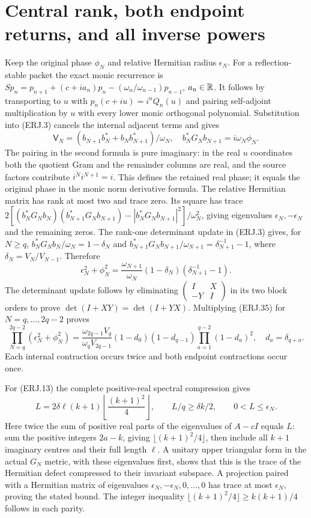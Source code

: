 \documentclass[11pt]{article}
\begin{document}
\section{Central rank, both endpoint returns, and all inverse powers}
Keep the original phase $\phi_N$ and relative Hermitian radius
$\epsilon_N$. For a reflection-stable packet the exact monic recurrence
is $Sp_n=p_{n+1}+(c+ia_n)p_n-(\omega_n/\omega_{n-1})p_{n-1}$,
$a_n\in\mathbb R$. It follows by transporting to $u$ with
$p_n(c+iu)=i^nQ_n(u)$ and pairing self-adjoint multiplication by $u$
with every lower monic orthogonal polynomial. Substitution into
(ERJ.3) cancels the internal adjacent terms and gives
\[
 \mathsf V_N=(b_{N+1}b_N^*+b_Nb_{N+1}^*)/\omega_N,
 \quad b_N^*G_Nb_{N+1}=i\omega_N\phi_N.
 \tag{ERJ.34}
\]
The pairing in the second formula is pure imaginary: in the real
$u$ coordinates both the quotient Gram and the remainder columns
are real, and the source factors contribute
$\overline{i^N}i^{N+1}=i$. This defines the retained real phase;
it equals the original phase in the monic norm derivative formula.
The relative Hermitian matrix has rank at most two and trace zero.
Its square has trace
$2[(b_N^*G_Nb_N)(b_{N+1}^*G_Nb_{N+1})-
|b_N^*G_Nb_{N+1}|^2]/\omega_N^2$, giving eigenvalues
$\epsilon_N,-\epsilon_N$ and the remaining zeros.
The rank-one determinant update in (ERJ.3) gives, for $N\ge q$,
$b_N^*G_Nb_N/\omega_N=1-\delta_N$ and
$b_{N+1}^*G_Nb_{N+1}/\omega_{N+1}=\delta_{N+1}^{-1}-1$,
where $\delta_N=V_N/V_{N-1}$. Therefore
\[
 \epsilon_N^2+\phi_N^2=
 \frac{\omega_{N+1}}{\omega_N}(1-\delta_N)
 (\delta_{N+1}^{-1}-1).\tag{ERJ.35}
\]
The determinant update follows by eliminating
$\left(\begin{smallmatrix}I&X\\-Y&I\end{smallmatrix}\right)$
in its two block orders to prove $\det(I+XY)=\det(I+YX)$.
Multiplying (ERJ.35) for $N=q,\ldots,2q-2$ proves
\[
 \prod_{N=q}^{2q-2}(\epsilon_N^2+\phi_N^2)
 =\frac{\omega_{2q-1}V_q}{\omega_qV_{2q-1}}
 (1-d_0)(1-d_{q-1})\prod_{a=1}^{q-2}(1-d_a)^2,
 \quad d_a=\delta_{q+a}.\tag{ERJ.36}
\]
Each internal contraction occurs twice and both endpoint contractions
occur once.

For (ERJ.13) the complete positive-real spectral compression gives
\[
 L=2\delta\ell(k+1)\left\lfloor\frac{(k+1)^2}{4}\right\rfloor,
 \qquad L/q\ge\delta k/2,\qquad0<L\le\epsilon_N.
 \tag{ERJ.37}
\]
Here twice the sum of positive real parts of the eigenvalues of
$A-cI$ equals $L$: sum the positive integers $2a-k$, giving
$\lfloor(k+1)^2/4\rfloor$, then include all $k+1$ imaginary
centres and their full length $\ell$. A unitary upper triangular form
in the actual $G_N$ metric, with these eigenvalues first, shows that
this is the trace of the Hermitian defect compressed to their invariant
subspace. A projection paired with a Hermitian matrix of eigenvalues
$\epsilon_N,-\epsilon_N,0,\ldots,0$ has trace at most
$\epsilon_N$, proving the stated bound. The integer inequality
$\lfloor(k+1)^2/4\rfloor\ge k(k+1)/4$ follows in each parity.
\end{document}
